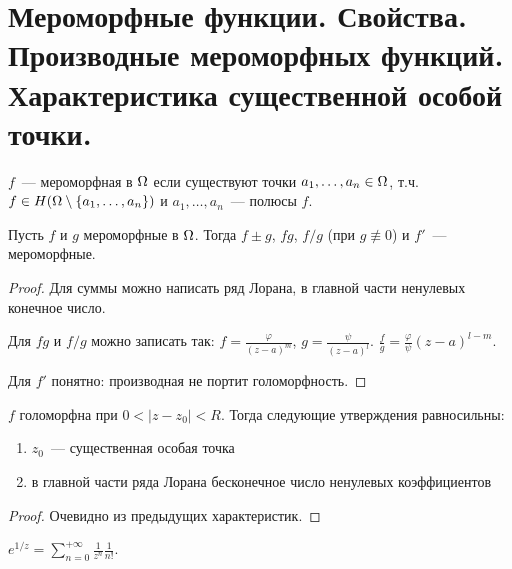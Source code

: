 \section{Мероморфные функции. Свойства. Производные мероморфных функций. Характеристика существенной особой точки.}

\begin{definition}
    $f$~--- мероморфная в $\Omega$ если
    существуют точки $a_1, \ldots, a_n \in \Omega$,
    т.ч. $f \in H(\Omega \setminus \left\{a_1, \ldots, a_n\right\})$
    и $a_1, \ldots, a_n$~--- полюсы $f$.
\end{definition}

\begin{properties}
    Пусть $f$ и $g$ мероморфные в $\Omega$.
    Тогда $f \pm g$, $fg$, $f/g$ (при $g \not\equiv 0$)
    и $f'$~--- мероморфные.
\end{properties}

\begin{proof}
    Для суммы можно написать ряд Лорана, в главной части ненулевых конечное число.

    Для $fg$ и $f/g$ можно записать так:
    $f = \frac{\varphi}{(z-a)^m}$, $g = \frac{\psi}{(z-a)^l}$.
    $\frac{f}{g} = \frac{\varphi}{\psi} (z-a)^{l-m}$.

    Для $f'$ понятно: производная не портит голоморфность.
\end{proof}

\begin{theorem}

    $f$ голоморфна при $0 < |z-z_0| < R$. Тогда
    следующие утверждения равносильны:

    \begin{enumerate}
        \item $z_0$~--- существенная особая точка
        \item в главной части ряда Лорана бесконечное число ненулевых коэффициентов
    \end{enumerate}
\end{theorem}

\begin{proof}
    Очевидно из предыдущих характеристик.
\end{proof}

\begin{consequence}
    $e^{1/z} = \sum\limits_{n=0}^{+\infty} \frac{1}{z^n} \frac{1}{n!}$.
\end{consequence}

\newpage
